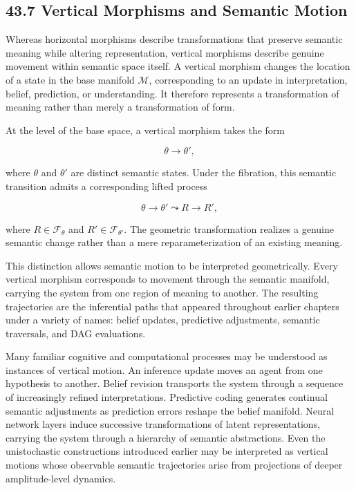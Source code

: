\documentclass[12pt,letterpaper]{article}
\theoremstyle{remark}
\begin{document}
\subsection{43.7 Vertical Morphisms and Semantic Motion}

Whereas horizontal morphisms describe transformations that preserve semantic meaning while altering representation, vertical morphisms describe genuine movement within semantic space itself. A vertical morphism changes the location of a state in the base manifold $\mathcal{M}$, corresponding to an update in interpretation, belief, prediction, or understanding. It therefore represents a transformation of meaning rather than merely a transformation of form.

At the level of the base space, a vertical morphism takes the form

\[
\theta \to \theta',
\]

where $\theta$ and $\theta'$ are distinct semantic states. Under the fibration, this semantic transition admits a corresponding lifted process

\[
\theta \to \theta'
\leadsto
R \to R',
\]

where $R \in \mathcal{F}_{\theta}$ and $R' \in \mathcal{F}_{\theta'}$. The geometric transformation realizes a genuine semantic change rather than a mere reparameterization of an existing meaning.

This distinction allows semantic motion to be interpreted geometrically. Every vertical morphism corresponds to movement through the semantic manifold, carrying the system from one region of meaning to another. The resulting trajectories are the inferential paths that appeared throughout earlier chapters under a variety of names: belief updates, predictive adjustments, semantic traversals, and DAG evaluations.

Many familiar cognitive and computational processes may be understood as instances of vertical motion. An inference update moves an agent from one hypothesis to another. Belief revision transports the system through a sequence of increasingly refined interpretations. Predictive coding generates continual semantic adjustments as prediction errors reshape the belief manifold. Neural network layers induce successive transformations of latent representations, carrying the system through a hierarchy of semantic abstractions. Even the unistochastic constructions introduced earlier may be interpreted as vertical motions whose observable semantic trajectories arise from projections of deeper amplitude-level dynamics.
\end{document}
